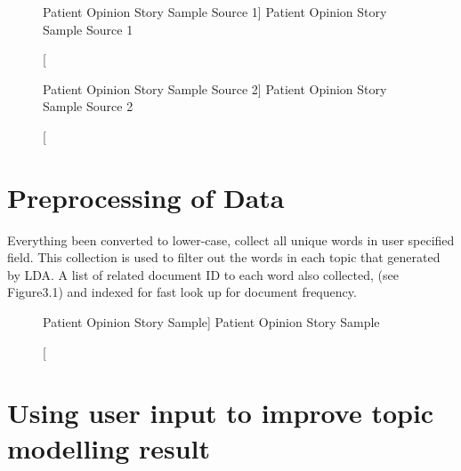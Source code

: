 \documentclass[11pt,twoside]{report}
\begin{document}
\begin{figure}[h]
    \begin{center}
    \caption
    [Patient Opinion Story Sample Source 1]
    {
    Patient Opinion Story Sample Source 1
    \label{Figure2}
    }
    \end{center}
\end{figure}

\begin{figure}[h]
    \begin{center}
    \caption
    [Patient Opinion Story Sample Source 2]
    {
    Patient Opinion Story Sample Source 2
    \label{Figure3}
    }
    \end{center}
\end{figure}

\section{Preprocessing of Data}

Everything been converted to lower-case, collect all unique words in user specified field. This collection is used to filter out the words in each topic that generated by LDA. A list of related document ID to each word also collected, (see Figure3.1) and indexed for fast look up for document frequency.

\begin{figure}[tp]
    \begin{center}
    \caption
    [Patient Opinion Story Sample]
    {
    Patient Opinion Story Sample
    \label{Figure4}
    }
    \end{center}
\end{figure}

\section{Using user input to improve topic modelling result}
\end{document}
